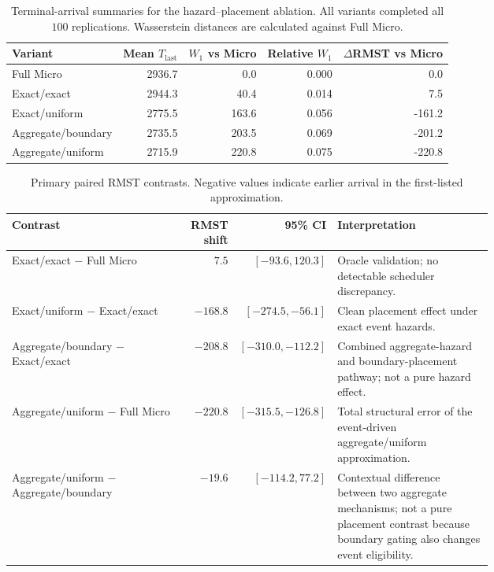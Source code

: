\begin{table}[t]
\centering
\small
\begin{tabular}{lrrrr}
\toprule
Variant & Mean $T_{\mathrm{last}}$ & $W_1$ vs Micro & Relative $W_1$ & $\Delta$RMST vs Micro \\
\midrule
Full Micro & 2936.7 & 0.0 & 0.000 & 0.0 \\
Exact/exact & 2944.3 & 40.4 & 0.014 & 7.5 \\
Exact/uniform & 2775.5 & 163.6 & 0.056 & -161.2 \\
Aggregate/boundary & 2735.5 & 203.5 & 0.069 & -201.2 \\
Aggregate/uniform & 2715.9 & 220.8 & 0.075 & -220.8 \\
\bottomrule
\end{tabular}
\caption{Terminal-arrival summaries for the hazard--placement ablation.  All variants completed all $100$ replications.  Wasserstein distances are calculated against Full Micro.}
\label{tab:hazard_placement_terminal}
\end{table}

\begin{table}[t]
\centering
\small
\begin{tabular}{p{0.38\linewidth}rrp{0.33\linewidth}}
\toprule
Contrast & RMST shift & 95\% CI & Interpretation \\
\midrule
Exact/exact $-$ Full Micro
& $7.5$ & $[-93.6,120.3]$
& Oracle validation; no detectable scheduler discrepancy. \\

Exact/uniform $-$ Exact/exact
& $-168.8$ & $[-274.5,-56.1]$
& Clean placement effect under exact event hazards. \\

Aggregate/boundary $-$ Exact/exact
& $-208.8$ & $[-310.0,-112.2]$
& Combined aggregate-hazard and boundary-placement pathway; not a pure hazard effect. \\

Aggregate/uniform $-$ Full Micro
& $-220.8$ & $[-315.5,-126.8]$
& Total structural error of the event-driven aggregate/uniform approximation. \\

Aggregate/uniform $-$ Aggregate/boundary
& $-19.6$ & $[-114.2,77.2]$
& Contextual difference between two aggregate mechanisms; not a pure placement contrast because boundary gating also changes event eligibility. \\
\bottomrule
\end{tabular}
\caption{Primary paired RMST contrasts.  Negative values indicate earlier arrival in the first-listed approximation.}
\label{tab:hazard_placement_contrasts}
\end{table}

